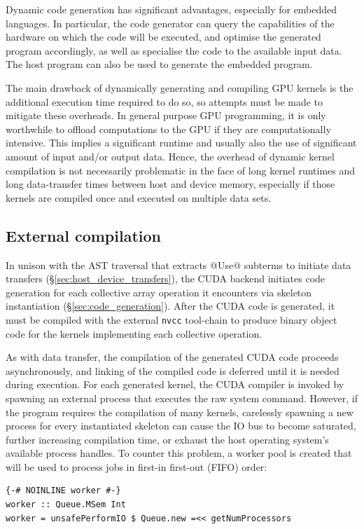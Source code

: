 Dynamic code generation has significant advantages, especially for embedded
languages. In particular, the code generator can query the capabilities of the
hardware on which the code will be executed, and optimise the generated program
accordingly, as well as specialise the code to the available input data. The
host program can also be used to generate the embedded program.

The main drawback of dynamically generating and compiling GPU kernels is the
additional execution time required to do so, so attempts must be made to
mitigate these overheads. In general purpose GPU programming, it is only
worthwhile to offload computations to the GPU if they are computationally
intensive. This implies a significant runtime and usually also the use of
significant amount of input and/or output data. Hence, the overhead of dynamic
kernel compilation is not necessarily problematic in the face of long kernel
runtimes and long data-transfer times between host and device memory, especially
if those kernels are compiled once and executed on multiple data sets.

\subsection{External compilation}
\label{sec:external_compilation}

In unison with the AST traversal that extracts @Use@ subterms to initiate
data transfers (\S\ref{sec:host_device_transfers}), the CUDA backend initiates
code generation for each collective array operation it encounters via skeleton
instantiation (\S\ref{sec:code_generation}). After the CUDA code is generated,
it must be compiled with the external \texttt{nvcc} tool-chain to produce binary
object code for the kernels implementing each collective operation.

As with data transfer, the compilation of the generated CUDA code proceeds
asynchronously, and linking of the compiled code is deferred until it is needed
during execution. For each generated kernel, the CUDA compiler is invoked by
spawning an external process that executes the raw system command. However, if
the program requires the compilation of many kernels, carelessly spawning a new
process for every instantiated skeleton can cause the IO bus to become
saturated, further increasing compilation time, or exhaust the host operating
system's available process handles. To counter this problem, a worker pool is
created that will be used to process jobs in first-in first-out (FIFO) order:
%
\begin{lstlisting}[style=haskell]
{-# NOINLINE worker #-}
worker :: Queue.MSem Int
worker = unsafePerformIO $ Queue.new =<< getNumProcessors
\end{lstlisting}

